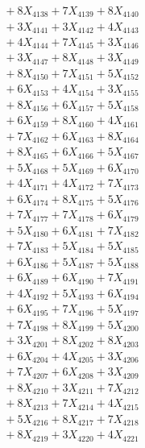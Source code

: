 \documentclass[a4paper,10pt]{article}
\begin{document}
{\begin{align}
&\;  + 8 X_{4138} + 7 X_{4139} + 8 X_{4140} \\[0.3ex]
&\;  + 3 X_{4141} + 3 X_{4142} + 4 X_{4143} \\[0.3ex]
&\;  + 4 X_{4144} + 7 X_{4145} + 3 X_{4146} \\[0.3ex]
&\;  + 3 X_{4147} + 8 X_{4148} + 3 X_{4149} \\[0.5ex]\allowbreak
&\;  + 8 X_{4150} + 7 X_{4151} + 5 X_{4152} \\[0.3ex]
&\;  + 6 X_{4153} + 4 X_{4154} + 3 X_{4155} \\[0.3ex]
&\;  + 8 X_{4156} + 6 X_{4157} + 5 X_{4158} \\[0.3ex]
&\;  + 6 X_{4159} + 8 X_{4160} + 4 X_{4161} \\[0.3ex]
&\;  + 7 X_{4162} + 6 X_{4163} + 8 X_{4164} \\[0.3ex]
&\;  + 8 X_{4165} + 6 X_{4166} + 5 X_{4167} \\[0.3ex]
&\;  + 5 X_{4168} + 5 X_{4169} + 6 X_{4170} \\[0.3ex]
&\;  + 4 X_{4171} + 4 X_{4172} + 7 X_{4173} \\[0.3ex]
&\;  + 6 X_{4174} + 8 X_{4175} + 5 X_{4176} \\[0.3ex]
&\;  + 7 X_{4177} + 7 X_{4178} + 6 X_{4179} \\[0.5ex]\allowbreak
&\;  + 5 X_{4180} + 6 X_{4181} + 7 X_{4182} \\[0.3ex]
&\;  + 7 X_{4183} + 5 X_{4184} + 5 X_{4185} \\[0.3ex]
&\;  + 6 X_{4186} + 5 X_{4187} + 5 X_{4188} \\[0.3ex]
&\;  + 6 X_{4189} + 6 X_{4190} + 7 X_{4191} \\[0.3ex]
&\;  + 4 X_{4192} + 5 X_{4193} + 6 X_{4194} \\[0.3ex]
&\;  + 6 X_{4195} + 7 X_{4196} + 5 X_{4197} \\[0.3ex]
&\;  + 7 X_{4198} + 8 X_{4199} + 5 X_{4200} \\[0.3ex]
&\;  + 3 X_{4201} + 8 X_{4202} + 8 X_{4203} \\[0.3ex]
&\;  + 6 X_{4204} + 4 X_{4205} + 3 X_{4206} \\[0.3ex]
&\;  + 7 X_{4207} + 6 X_{4208} + 3 X_{4209} \\[0.5ex]\allowbreak
&\;  + 8 X_{4210} + 3 X_{4211} + 7 X_{4212} \\[0.3ex]
&\;  + 8 X_{4213} + 7 X_{4214} + 4 X_{4215} \\[0.3ex]
&\;  + 5 X_{4216} + 8 X_{4217} + 7 X_{4218} \\[0.3ex]
&\;  + 8 X_{4219} + 3 X_{4220} + 4 X_{4221} \\[0.3ex]

\end{align}}
\end{document}
